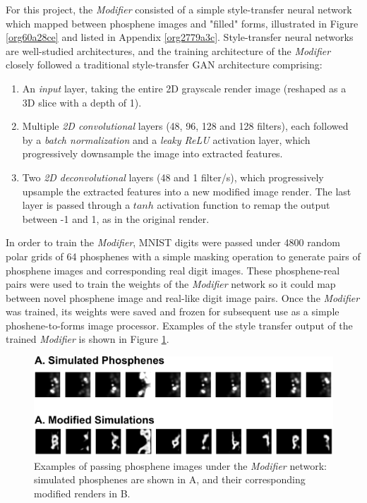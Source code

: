 \documentclass[a4paper,11pt,openany]{book}
\begin{document}
For this project, the \emph{Modifier} consisted of a simple style-transfer neural network which mapped between phosphene images and "filled" forms, illustrated in Figure \ref{org60a28ce} and listed in Appendix \ref{org2779a3c}.
Style-transfer neural networks are well-studied architectures, and the training architecture of the \emph{Modifier} closely followed a traditional style-transfer GAN architecture comprising:
\begin{enumerate}
\item An \emph{input} layer, taking the entire 2D grayscale render image (reshaped as a 3D slice with a depth of 1).
\item Multiple \emph{2D convolutional} layers (48, 96, 128 and 128 filters), each followed by a \emph{batch normalization} and a \emph{leaky ReLU} activation layer, which progressively downsample the image into extracted features.
\item Two \emph{2D deconvolutional} layers (48 and 1 filter/s), which progressively upsample the extracted features into a new modified image render.
The last layer is passed through a \(tanh\) activation function to remap the output between -1 and 1, as in the original render.
\end{enumerate}

In order to train the \emph{Modifier}, MNIST digits were passed under 4800 random polar grids of 64 phosphenes with a simple masking operation to generate pairs of phosphene images and corresponding real digit images.
These phosphene-real pairs were used to train the weights of the \emph{Modifier} network so it could map between novel phosphene image and real-like digit image pairs.
Once the \emph{Modifier} was trained, its weights were saved and frozen for subsequent use as a simple phoshene-to-forms image processor.
Examples of the style transfer output of the trained \emph{Modifier} is shown in Figure \ref{orge816f1b}.

\begin{figure}
\begin{center}
\includegraphics[width=.9\linewidth]{./images/methods_modifier_examples.png}
\end{center}
\caption[Examples of passing phosphene images under the \emph{Modifier} network]{\label{orge816f1b}
Examples of passing phosphene images under the \emph{Modifier} network: simulated phosphenes are shown in A, and their corresponding modified renders in B.}
\end{figure}
\end{document}
